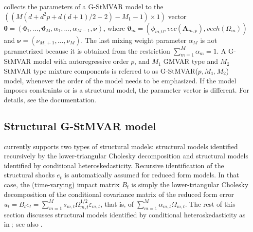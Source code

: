 \documentclass[nojss]{jss}
\begin{document}
 collects the parameters of a G-StMVAR model to the $((M(d + d^2p + d(d+1)/2 + 2) - M_1 - 1)\times 1)$ vector $\boldsymbol{\theta}=(\boldsymbol{\vartheta}_1,...,\boldsymbol{\vartheta}_M,\alpha_1,...,\alpha_{M-1},\boldsymbol{\nu})$,  where $\boldsymbol{\vartheta}_m=(\phi_{m,0},vec(\boldsymbol{A}_{m,p}),vech(\Omega_m))$ and $\boldsymbol{\nu}=(\nu_{M_1+1},...,\nu_M)$.  The last mixing weight parameter $\alpha_M$ is not parametrized because it is obtained from the restriction $\sum_{m=1}^M \alpha_m = 1$.  A G-StMVAR model with autoregressive order $p$, and $M_1$ GMVAR type and $M_2$ StMVAR type mixture components is referred to as G-StMVAR($p,M_1,M_2$) model, whenever the order of the model needs to be emphasized. If the model imposes constraints or is a structural model, the parameter vector is different. For details, see the documentation.


\subsection{Structural G-StMVAR model}\label{sec:structural_model}

 currently supports two types of structural models: structural models identified recursively by the lower-triangular Cholesky decomposition and structural models identified by conditional heteroskedasticity. Recursive identification of the structural shocks $e_t$ is automatically assumed for reduced form models. In that case, the (time-varying) impact matrix $B_t$ is simply the lower-triangular Cholesky decomposition of the conditional covariance matrix of the reduced form error $u_t=B_te_t=\sum_{m=1}^Ms_{m,t}\Omega_{m,t}^{1/2}\varepsilon_{m,t}$, that is, of $\sum_{m=1}^M\alpha_{m,t}\Omega_{m,t}$. The rest of this section discusses structural models identified by conditional heteroskedasticity as in \cite{Virolainen:2025}; see also \cite{Virolainen2:2021}.
\end{document}
